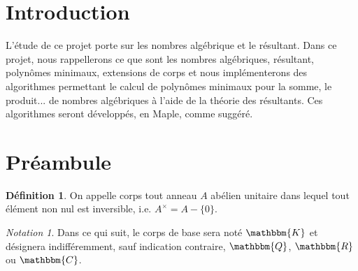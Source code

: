 \documentclass[12pt]{article}
\newcommand{\Q}{\mathbbm{Q}}
\newcommand{\R}{\mathbbm{R}}
\newcommand{\C}{\mathbbm{C}}
\newcommand{\K}{\mathbbm{K}}
\theoremstyle{definition}\newtheorem{defn}{Définition}
\theoremstyle{definition}\newtheorem{exm}{Exemple}
\theoremstyle{definition}\newtheorem{rem}{Remarque}
\theoremstyle{definition}\newtheorem{algo}{Algorithme}
\theoremstyle{remark}\newtheorem{exo}{Exercice}
\theoremstyle{remark}\newtheorem{nota}{Notation}
\begin{document}

\tableofcontents


\pagebreak
\section*{Introduction}
L'étude de ce projet porte sur les nombres algébrique et le résultant. Dans ce projet, nous rappellerons ce que sont les nombres algébriques, résultant, polynômes minimaux, extensions de corps et nous implémenterons des algorithmes permettant le calcul de polynômes minimaux pour la somme, le produit... de nombres algébriques à l'aide de la théorie des résultants. Ces algorithmes seront développés, en \textsf{Maple}, comme suggéré.

\vfill \eject


\pagebreak 


\section{Préambule}

\begin{defn}
On appelle corps tout anneau $A$ abélien unitaire dans lequel tout élément non nul est inversible, i.e. $A^{\times} = A  - \{0\}$.
\end{defn}

\begin{nota}
Dans ce qui suit, le corps de base sera noté $\K$ et désignera indifféremment, sauf indication contraire, $\Q$, $\R$ ou $\C$. 
\end{nota}
\end{document}
